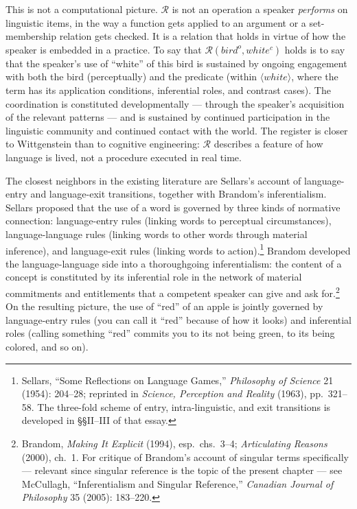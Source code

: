 \documentclass[12pt,a4paper]{article}
\begin{document}
This is not a computational picture. \(\mathcal{R}\) is not an operation a speaker \emph{performs} on linguistic items, in the way a function gets applied to an argument or a set-membership relation gets checked. It is a relation that holds in virtue of how the speaker is embedded in a practice. To say that \(\mathcal{R}(bird^o, white^c)\) holds is to say that the speaker's use of ``white'' of this bird is sustained by ongoing engagement with both the bird (perceptually) and the predicate (within \(\langle white \rangle\), where the term has its application conditions, inferential roles, and contrast cases). The coordination is constituted developmentally --- through the speaker's acquisition of the relevant patterns --- and is sustained by continued participation in the linguistic community and continued contact with the world. The register is closer to Wittgenstein than to cognitive engineering: \(\mathcal{R}\) describes a feature of how language is lived, not a procedure executed in real time.

The closest neighbors in the existing literature are Sellars's account of language-entry and language-exit transitions, together with Brandom's inferentialism. Sellars proposed that the use of a word is governed by three kinds of normative connection: language-entry rules (linking words to perceptual circumstances), language-language rules (linking words to other words through material inference), and language-exit rules (linking words to action).\footnote{Sellars, ``Some Reflections on Language Games,'' \emph{Philosophy of Science} 21 (1954): 204--28; reprinted in \emph{Science, Perception and Reality} (1963), pp.~321--58. The three-fold scheme of entry, intra-linguistic, and exit transitions is developed in §§II--III of that essay.} Brandom developed the language-language side into a thoroughgoing inferentialism: the content of a concept is constituted by its inferential role in the network of material commitments and entitlements that a competent speaker can give and ask for.\footnote{Brandom, \emph{Making It Explicit} (1994), esp.~chs.~3--4; \emph{Articulating Reasons} (2000), ch.~1. For critique of Brandom's account of singular terms specifically --- relevant since singular reference is the topic of the present chapter --- see McCullagh, ``Inferentialism and Singular Reference,'' \emph{Canadian Journal of Philosophy} 35 (2005): 183--220.} On the resulting picture, the use of ``red'' of an apple is jointly governed by language-entry rules (you can call it ``red'' because of how it looks) and inferential roles (calling something ``red'' commits you to its not being green, to its being colored, and so on).
\end{document}
